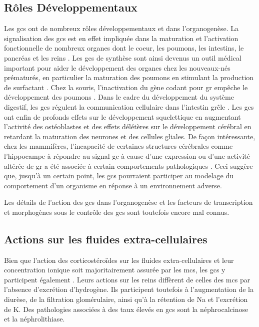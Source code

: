 \documentclass[../main.tex]{subfiles}
\begin{document}
\subsection{Rôles Développementaux}
Les \glspl{gc} ont de nombreux rôles développementaux et dans l'organogenèse.
La signalisation des \glspl{gc} est en effet impliquée dans la maturation et l'activation fonctionnelle de nombreux organes dont le coeur, les poumons, les intestins, le pancréas et les reins \citep{Majumdar1985,Liggins1994,Pierce1995,Gesina2004}.
Les \glspl{gc} de synthèse sont ainsi devenus un outil médical important pour aider le développement des organes chez les nouveaux-nés prématurés, en particulier la maturation des poumons \citep{Becker2001} en stimulant la production de surfactant \citep{Bolt2001}.
Chez la souris, l'inactivation du gène codant pour \gls{gr} empêche le développement des poumons \citep{Cole2001}.
Dans le cadre du développement du système digestif, les \glspl{gc} régulent la communication cellulaire dans l'intestin grêle \citep{Schaeffer2000}.
Les \glspl{gc} ont enfin de profonds effets sur le développement squelettique en augmentant l'activité des ostéoblastes et des effets délétères sur le développement cérébral en retardant la maturation des neurones et des cellules gliales.
De façon intéressante, chez les mammifères, l'incapacité de certaines structures cérébrales comme l'hippocampe à répondre au signal \gls{gc} à cause d'une expression ou d'une activité altérée de \gls{gr} a été associée à certain comportements pathologiques \citep{Liu1997,McGowan2009,Zhang2013}.
Ceci suggère que, jusqu'à un certain point, les \glspl{gc} pourraient participer au modelage du comportement d'un organisme en réponse à un environnement adverse.
\par
Les détails de l'action des \glspl{gc} dans l'organogenèse et les facteurs de transcription et morphogènes sous le contrôle des \glspl{gc} sont toutefois encore mal connus.


\subsection{Actions sur les fluides extra-cellulaires}
Bien que l'action des corticostéroïdes sur les fluides extra-cellulaires et leur concentration ionique soit majoritairement assurée par les \glspl{mc}, les \glspl{gc} y participent également \citep{McKay2003}.
Leurs actions sur les reins diffèrent de celles des \glspl{mc} par l'absence d'excrétion d'hydrogène.
Ils participent toutefois à l'augmentation de la diurèse, de la filtration glomérulaire, ainsi qu'à la rétention de \gls{Na} et l'excrétion de \gls{K}.
Des pathologies associées à des taux élevés en \glspl{gc} sont la néphrocalcinose et la néphrolithiase.
\end{document}
